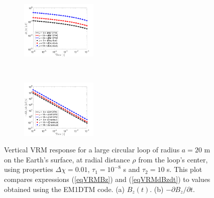 \documentclass[onecolumn]{IEEEtran} %
\begin{document}
\begin{figure}[!b]
    \centering
    \vspace{-10pt}
    \begin{subfigure}[b]{0.49\textwidth}
    \includegraphics[width=0.4\textwidth]{DCowanVRM2017/imagesColor/figVRMrespBz.png}
    \label{figVRMrespBz}
    \end{subfigure}
    ~
    \begin{subfigure}[b]{0.49\textwidth}
    \includegraphics[width=0.4\textwidth]{DCowanVRM2017/imagesColor/figVRMrespdBzdt.png}
    \label{figVRMrespdBzdt}
    \end{subfigure}
    \caption{Vertical VRM response for a large circular loop of radius $a=20$ m on the Earth's surface, at radial distance $\rho$ from the loop's center, using properties $\Delta \chi=0.01$, $\tau_1 = 10^{-8}$ s and $\tau_2=10$ s. This plot compares expressions (\ref{eqVRMBz}) and (\ref{eqVRMdBzdt}) to values obtained using the EM1DTM code. (a) $B_z (t)$. (b) $-\partial B_z/\partial t$.}
    \label{figVRMrespZ}
\end{figure}
%
\end{document}
